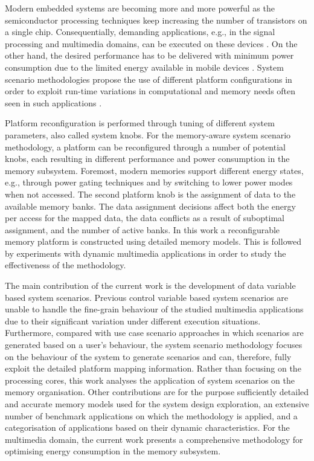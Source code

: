 \documentclass[a4paper,conference]{IEEEtran}
\begin{document}
Modern embedded systems are becoming more and more powerful as the semiconductor processing techniques keep increasing the number of transistors on a single chip. Consequentially, demanding applications, e.g., in the signal processing and multimedia domains, can be executed on these devices \cite{narasinga}. On the other hand, the desired performance has to be delivered with minimum power consumption due to the limited energy available in mobile devices \cite{tcm}. System scenario methodologies propose the use of different platform configurations in order to exploit run-time variations in computational and memory needs often seen in such applications \cite{tcm}.

Platform reconfiguration is performed through tuning of different system parameters, also called system knobs. For the memory-aware system scenario methodology, a platform can be reconfigured through a number of potential knobs, each resulting in different performance and power consumption in the memory subsystem. Foremost, modern memories support different energy states, e.g., through power gating techniques and by switching to lower power modes when not accessed. %
The second platform knob is the assignment of data to the available memory banks. The data assignment decisions affect both the energy per access for the mapped data, the data conflicts as a result of suboptimal assignment, and the number of active banks. In this work a reconfigurable memory platform is constructed using detailed memory models. This is followed by experiments with dynamic multimedia applications in order to study the effectiveness of the methodology.

The main contribution of the current work is the development of data variable based system scenarios. Previous control variable based system scenarios are unable to handle the fine-grain behaviour of the studied multimedia applications due to their significant variation under different execution situations. Furthermore, compared with use case scenario approaches in which scenarios are generated based on a user's behaviour, the system scenario methodology focuses on the behaviour of the system to generate scenarios and can, therefore, fully exploit the detailed platform mapping information. Rather than focusing on the processing cores, this work analyses the application of system scenarios on the memory organisation. Other contributions are for the purpose sufficiently detailed and accurate memory models used for the system design exploration, an extensive number of benchmark applications on which the methodology is applied, and a categorisation of applications based on their dynamic characteristics. For the multimedia domain, the current work presents a comprehensive methodology for optimising energy consumption in the memory subsystem.
\end{document}
